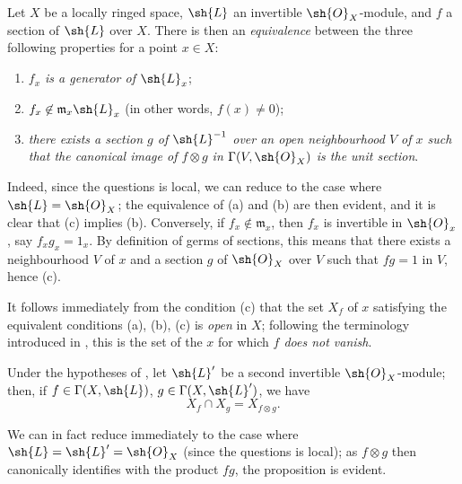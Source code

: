 \begin{env}[5.5.2]
\label{0.5.5.2}
Let $X$ be a locally ringed space, $\sh{L}$ an invertible $\sh{O}_X$-module, and $f$ a section of $\sh{L}$ over $X$.
There is then an \emph{equivalence} between the three following properties for a point $x\in X$:
\begin{enumerate}
  \item[(a)] \emph{$f_x$ is a generator of $\sh{L}_x$};
  \item[(b)] \emph{$f_x\not\in\mathfrak{m}_x\sh{L}_x$} (in other words, $f(x)\neq 0$);
  \item[(c)] \emph{there exists a section $g$ of $\sh{L}^{-1}$ over an open neighbourhood $V$ of $x$ such that the canonical image of $f\otimes g$ in $\Gamma(V,\sh{O}_X)$  is the unit section}.
\end{enumerate}

Indeed, since the questions is local, we can reduce to the case where $\sh{L}=\sh{O}_X$;
the equivalence of (a) and (b) are then evident, and it is clear that (c) implies (b).
Conversely, if $f_x\not\in\mathfrak{m}_x$, then $f_x$ is invertible in $\sh{O}_x$, say $f_x g_x=1_x$.
By definition of germs of sections, this means that there exists a neighbourhood $V$ of $x$ and a section $g$ of $\sh{O}_X$ over $V$ such that $fg=1$ in $V$, hence (c).

It follows immediately from the condition (c) that the set $X_f$ of $x$ satisfying the equivalent conditions (a), (b), (c) is \emph{open} in $X$;
following the terminology introduced in , this is the set of the $x$ for which \emph{$f$ does not vanish}.
\end{env}

\begin{env}[5.5.3]
\label{0.5.5.3}
Under the hypotheses of , let $\sh{L}'$ be a second invertible $\sh{O}_X$-module;
then, if $f\in\Gamma(X,\sh{L})$, $g\in\Gamma(X,\sh{L}')$, we have
\[
  X_f\cap X_g=X_{f\otimes g}.
\]

We can in fact reduce immediately to the case where $\sh{L}=\sh{L}'=\sh{O}_X$ (since the questions is local);
as $f\otimes g$ then canonically identifies with the product $fg$, the proposition is evident.
\end{env}

